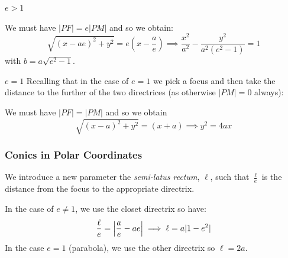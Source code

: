 \documentclass[../main.tex]{subfiles}
\begin{document}
\begin{proofcases}
\begin{case}{$e > 1$}
\begin{center}
    \end{center}
    We must have $|PF| = e|PM|$ and so we obtain:
    \begin{equation}
      \sqrt{(x - ae)^2 + y^2} = e\left(x - \frac{a}{e}\right) \implies
      \frac{x^2}{a^2} - \frac{y^2}{a^2(e^2 - 1)} = 1 \label{hyperbolaCartesian}
    \end{equation}
    with $b = a\sqrt{e^2 - 1}$.
  \end{case}
  \begin{case}{$e = 1$}
    Recalling that in the case of $e = 1$ we pick a focus and then take the distance to the further of the two directrices (as otherwise $|PM| = 0$ always):
    \begin{center}
    \end{center}
    We must have $|PF| = |PM|$ and so we obtain
    \[
      \sqrt{(x - a)^2 + y^2} = (x + a) \implies y^2 = 4ax
    \]
  \end{case}
\end{proofcases}
\subsubsection{Conics in Polar Coordinates}
We introduce a new parameter the \textit{semi-latus rectum}, $\ell$, such that $\frac{\ell}{e}$ is the distance from the focus to the appropriate directrix.

In the case of $e \neq 1$, we use the closet directrix so have:
\[
  \frac{\ell}{e} = \left\lvert \frac{a}{e} - ae \right\rvert \implies \ell = a|1 - e^2|
\]
In the case $e = 1$ (parabola), we use the other directrix so $\ell = 2a$.
\end{document}

